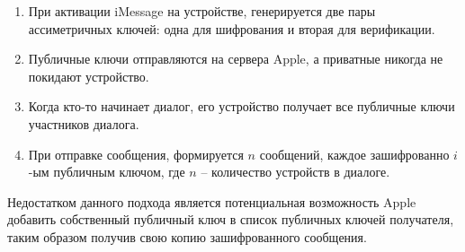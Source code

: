 \begin{enumerate}
	\item При активации iMessage на устройстве, генерируется две пары ассиметричных ключей: одна для шифрования и вторая для верификации.
	\item Публичные ключи отправляются на сервера Apple, а приватные никогда не покидают устройство.
	\item Когда кто-то начинает диалог, его устройство получает все публичные ключи участников диалога.
	\item При отправке сообщения, формируется \(n\) сообщений, каждое зашифрованно \(i\)-ым публичным ключом, где \(n\) -- количество устройств в диалоге.
\end{enumerate}

Недостатком данного подхода является потенциальная возможность Apple добавить собственный публичный ключ в список публичных ключей получателя, таким образом получив свою копию зашифрованного сообщения.